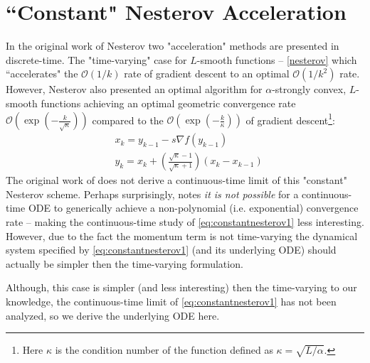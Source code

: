 \documentclass{article}
\begin{document}
\section{``Constant" Nesterov Acceleration}
In the original work of Nesterov \cite{DBLP:journals/ftml/Bubeck15, nesterov2004introductory} two "acceleration" methods are presented in discrete-time. The "time-varying" case for $L$-smooth functions -- \eqref{nesterov} which ``accelerates" the $\mathcal{O}(1/k)$ rate of gradient descent to an optimal $\mathcal{O}(1/k^2)$ rate. However, Nesterov also presented an optimal algorithm for $\alpha$-strongly convex, $L$-smooth functions achieving an optimal geometric convergence rate $\mathcal{O} \left (\exp(-\frac{k}{\sqrt{\kappa}}) \right)$ compared to the $\mathcal{O} \left (\exp(-\frac{k}{\kappa}) \right)$ of gradient descent\footnote{Here $\kappa$ is the condition number of the function defined as $\kappa = \sqrt{L/\alpha}$.}:
\begin{align}
    & x_{k} = y_{k-1} - s \nabla f(y_{k-1}) \label{eq:constantnesterov1} \\
    & y_{k} = x_{k} + \left( \frac{\sqrt{\kappa}-1}{\sqrt{\kappa}+1} \right) \left( x_{k} - x_{k-1} \right)  \label{eq:constantnesterov2}
\end{align}
 The original work of \cite{su2014differential} does not derive a continuous-time limit of this "constant" Nesterov scheme. Perhaps surprisingly, \cite{su2014differential} notes \textit{it is not possible} for a continuous-time ODE to generically achieve a non-polynomial (i.e. exponential) convergence rate -- making the continuous-time study of \eqref{eq:constantnesterov1} less interesting. However, due to the fact the momentum term is not time-varying the dynamical system specified by \eqref{eq:constantnesterov1}  (and its underlying ODE) should actually be simpler then the time-varying formulation. 
 
 Although, this case is simpler (and less interesting) then the time-varying to our knowledge, the continuous-time limit of \eqref{eq:constantnesterov1} has not been analyzed, so we derive the underlying ODE here. 
 
\end{document}

